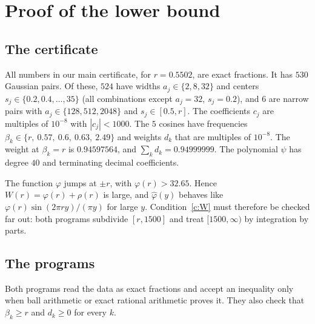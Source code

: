 \documentclass[11pt]{amsart}
\theoremstyle{definition}
\theoremstyle{remark}
\numberwithin{equation}{section}
\newcommand{\ft}[1]{\widehat{#1}}
\newcommand{\rdec}{0.5502}
\newcommand{\npairsU}{530}
\newcommand{\nwideU}{524}
\newcommand{\nnarrowU}{6}
\newcommand{\ncosU}{5}
\newcommand{\betasU}{r,\ 0.57,\ 0.6,\ 0.63,\ 2.49}
\newcommand{\dmainU}{0.94597564}
\newcommand{\dsumU}{0.94999999}
\newcommand{\cmaxU}{1000}
\newcommand{\psidegU}{40}
\newcommand{\phirU}{32.65}
\newcommand{\YTU}{1500}
\begin{document}
\section{Proof of the lower bound}\label{sec:proof}

\subsection{The certificate} All numbers in our main certificate, for $r=\rdec$, are exact fractions. It has $\npairsU$ Gaussian pairs. Of these, $\nwideU$ have widths $a_j\in\{2,8,32\}$ and centers $s_j\in\{0.2,0.4,\dots,35\}$ (all combinations except $a_j=32$, $s_j=0.2$), and $\nnarrowU$ are narrow pairs with $a_j\in\{128,512,2048\}$ and $s_j\in[0.5,r]$. The coefficients $c_j$ are multiples of $10^{-8}$ with $|c_j|<\cmaxU$. The $\ncosU$ cosines have frequencies $\beta_k\in\{\betasU\}$ and weights $d_k$ that are multiples of $10^{-8}$. The weight at $\beta_k=r$ is $\dmainU$, and $\sum_kd_k=\dsumU$. The polynomial $\psi$ has degree $\psidegU$ and terminating decimal coefficients.

The function $\varphi$ jumps at $\pm r$, with $\varphi(r)>\phirU$. Hence $W(r)=\varphi(r)+\rho(r)$ is large, and $\ft\varphi(y)$ behaves like $\varphi(r)\sin(2\pi ry)/(\pi y)$ for large $y$. Condition~\ref{c:W} must therefore be checked far out: both programs subdivide $[r,\YTU]$ and treat $[\YTU,\infty)$ by integration by parts.

\subsection{The programs} Both programs read the data as exact fractions and accept an inequality only when ball arithmetic or exact rational arithmetic proves it. They also check that $\beta_k\ge r$ and $d_k\ge0$ for every $k$.
\end{document}
